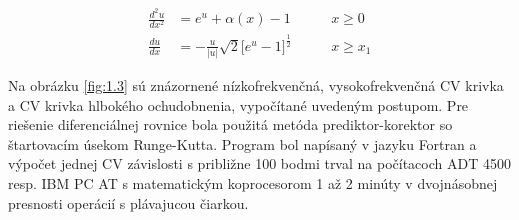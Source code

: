 \begin{subequations}\label{eq:A.14}
\begin{align}
\frac{d^2u}{dx^2} &= {e^u + \alpha(x) - 1} \qquad &{x\ge0}\label{subeq:A.14a}\\[0.5cm]
\frac{du}{dx} &= - \frac{u}{|u|} \sqrt{2} \Big[e^u - 1\Big]^{\frac{1}{2}} \qquad &{x\ge{x_1}}\label{subeq:A.14b}
\end{align}
\end{subequations}

Na obrázku \ref{fig:1.3} sú znázornené nízkofrekvenčná,
vysokofrekvenčná CV krivka a CV krivka hlbokého ochudobnenia,
vypočítané uvedeným postupom. Pre riešenie diferenciálnej rovnice bola
použitá metóda prediktor-korektor so štartovacím úsekom
Runge-Kutta. Program bol napísaný v jazyku Fortran a výpočet jednej CV
závislosti s približne 100 bodmi trval na počítacoch ADT 4500
resp. IBM PC AT s matematickým koprocesorom 1 až 2 minúty v
dvojnásobnej presnosti operácií s plávajucou čiarkou.
